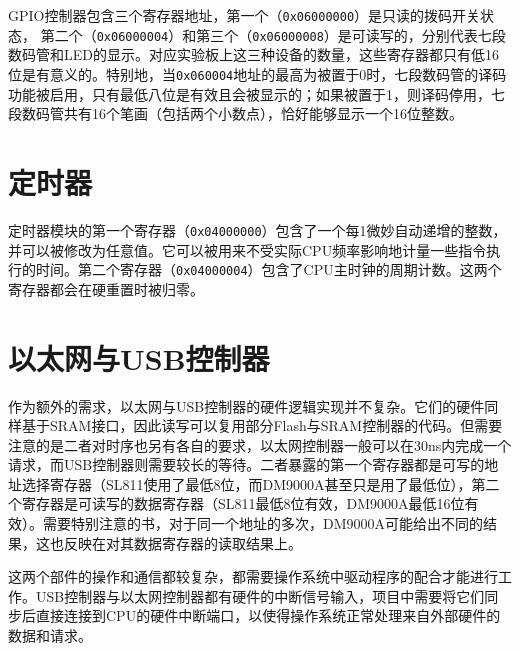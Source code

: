 GPIO控制器包含三个寄存器地址，第一个（\texttt{0x06000000}）是只读的拨码开关状态， 第二个（\texttt{0x06000004}）和第三个（\texttt{0x06000008}）是可读写的，分别代表七段数码管和LED的显示。对应实验板上这三种设备的数量，这些寄存器都只有低16位是有意义的。特别地，当\texttt{0x060004}地址的最高为被置于0时，七段数码管的译码功能被启用，只有最低八位是有效且会被显示的；如果被置于1，则译码停用，七段数码管共有16个笔画（包括两个小数点），恰好能够显示一个16位整数。

\section{定时器}

定时器模块的第一个寄存器（\texttt{0x04000000}）包含了一个每1微妙自动递增的整数，并可以被修改为任意值。它可以被用来不受实际CPU频率影响地计量一些指令执行的时间。第二个寄存器（\texttt{0x04000004}）包含了CPU主时钟的周期计数。这两个寄存器都会在硬重置时被归零。

\section{以太网与USB控制器}

作为额外的需求，以太网与USB控制器的硬件逻辑实现并不复杂。它们的硬件同样基于SRAM接口，因此读写可以复用部分Flash与SRAM控制器的代码。但需要注意的是二者对时序也另有各自的要求，以太网控制器一般可以在30ns内完成一个请求，而USB控制器则需要较长的等待。二者暴露的第一个寄存器都是可写的地址选择寄存器（SL811使用了最低8位，而DM9000A甚至只是用了最低位），第二个寄存器是可读写的数据寄存器（SL811最低8位有效，DM9000A最低16位有效）。需要特别注意的书，对于同一个地址的多次，DM9000A可能给出不同的结果，这也反映在对其数据寄存器的读取结果上。

这两个部件的操作和通信都较复杂，都需要操作系统中驱动程序的配合才能进行工作。USB控制器与以太网控制器都有硬件的中断信号输入，项目中需要将它们同步后直接连接到CPU的硬件中断端口，以使得操作系统正常处理来自外部硬件的数据和请求。
